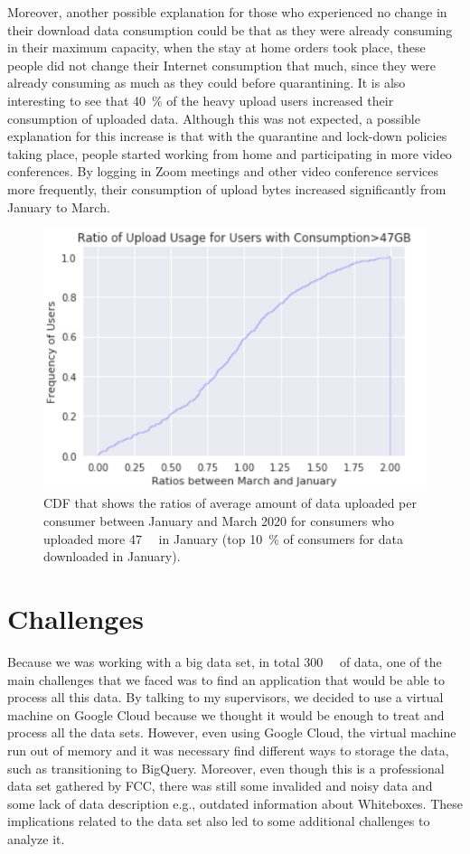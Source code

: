 \documentclass[conference]{IEEEtran}
\begin{document}
Moreover, another possible explanation for those who experienced no change in their download data consumption could be that as they were already consuming in their maximum capacity, when the stay at home orders took place, these people did not change their Internet consumption that much, since they were already consuming as much as they could before quarantining. It is also interesting to see that \SI{40}{\percent} of the heavy upload users increased their consumption of uploaded data. Although this was not expected, a possible explanation for this increase is that with the quarantine and lock-down policies taking place, people started working from home and participating in more video conferences. By logging in Zoom meetings and other video conference services more frequently, their consumption of upload bytes increased significantly from January to March. 
\begin{figure}[h!]
\centering
\includegraphics[width=1.0\linewidth]{heavyup.PNG}
\caption{CDF that shows the ratios of average amount of data uploaded per consumer between January and March 2020 for consumers who uploaded more \SI{47}{\giga\byte} in January (top \SI{10}{\percent} of consumers for data downloaded in January).}
\label{fig:heavyup}
\end{figure}

\section{Challenges}
Because we was working with a big data set, in total \SI{300}{\giga\byte} of data, one of the main challenges that we faced was to find an application that would be able to process all this data. By talking to my supervisors, we decided to use a virtual machine on Google Cloud because we thought it would be enough to treat and process all the data sets. However, even using Google Cloud, the virtual machine run out of memory and it was necessary find different ways to storage the data, such as transitioning to BigQuery. Moreover, even though this is a professional data set gathered by FCC, there was still some invalided and noisy data and some lack of data description e.g., outdated information about Whiteboxes. These implications related to the data set also led to some additional challenges to analyze it.
\end{document}
